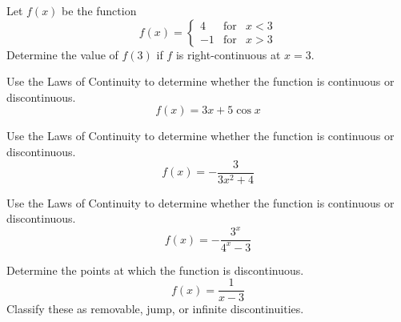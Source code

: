 \documentclass[12pt,addpoints, answers, fleqn]{exam}
\begin{document}
\begin{teacher}
\begin{questions}
\begin{solution}
\end{solution}

\question 	%

Let $f\left(x\right)$ be the function
\[
f\left( x \right) =
\left\{
{\begin{array}{*{20}{r}}
4 & \text{for} & x < 3\\
- 1 & \text{for} & x > 3
\end{array}}
\right.
\]
Determine the value of $f\left( 3 \right)$ if $f$ is right-continuous at $x = 3$.



\begin{solution}
\end{solution}

\question 	%

Use the Laws of Continuity to determine whether the function is continuous or discontinuous.
\[
f\left(x\right) = 3x + 5 \cos x
\]


\begin{solution}
\end{solution}

\question 	%

Use the Laws of Continuity to determine whether the function is continuous or discontinuous.
\[
f\left(x\right) = -\frac{3}{3x^2+4}
\]


\begin{solution}
\end{solution}

\question 	%

Use the Laws of Continuity to determine whether the function is continuous or discontinuous.
\[
f\left(x\right) = -\frac{3^x}{4^x-3}
\]


\begin{solution}
\end{solution}

\question 	%

Determine the points at which the function is discontinuous.
\[
f\left(x\right) = \frac{1}{x-3}
\] 
Classify these as removable, jump, or infinite discontinuities.


\begin{solution}
\end{solution}

\question 	%


\end{questions}
\end{teacher}
\end{document}
